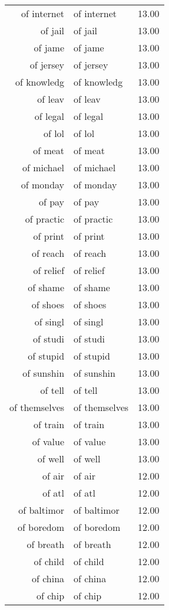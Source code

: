 \begin{table}[ht]
\begin{tabular}{rlr}
  of internet & of internet & 13.00 \\ 
  of jail & of jail & 13.00 \\ 
  of jame & of jame & 13.00 \\ 
  of jersey & of jersey & 13.00 \\ 
  of knowledg & of knowledg & 13.00 \\ 
  of leav & of leav & 13.00 \\ 
  of legal & of legal & 13.00 \\ 
  of lol & of lol & 13.00 \\ 
  of meat & of meat & 13.00 \\ 
  of michael & of michael & 13.00 \\ 
  of monday & of monday & 13.00 \\ 
  of pay & of pay & 13.00 \\ 
  of practic & of practic & 13.00 \\ 
  of print & of print & 13.00 \\ 
  of reach & of reach & 13.00 \\ 
  of relief & of relief & 13.00 \\ 
  of shame & of shame & 13.00 \\ 
  of shoes & of shoes & 13.00 \\ 
  of singl & of singl & 13.00 \\ 
  of studi & of studi & 13.00 \\ 
  of stupid & of stupid & 13.00 \\ 
  of sunshin & of sunshin & 13.00 \\ 
  of tell & of tell & 13.00 \\ 
  of themselves & of themselves & 13.00 \\ 
  of train & of train & 13.00 \\ 
  of value & of value & 13.00 \\ 
  of well & of well & 13.00 \\ 
  of air & of air & 12.00 \\ 
  of atl & of atl & 12.00 \\ 
  of baltimor & of baltimor & 12.00 \\ 
  of boredom & of boredom & 12.00 \\ 
  of breath & of breath & 12.00 \\ 
  of child & of child & 12.00 \\ 
  of china & of china & 12.00 \\ 
  of chip & of chip & 12.00 \\ 

\end{tabular}
\end{table}

